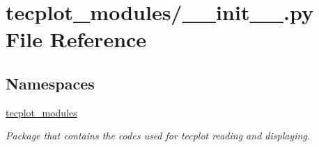 \hypertarget{a00323}{}\section{tecplot\+\_\+modules/\+\_\+\+\_\+init\+\_\+\+\_\+.py File Reference}
\label{a00323}
\subsection*{Namespaces}
\begin{DoxyCompactItemize}
\item 
 \hyperlink{a00062}{tecplot\+\_\+modules}
\begin{DoxyCompactList}\small\item\em Package that contains the codes used for tecplot reading and displaying. \end{DoxyCompactList}\end{DoxyCompactItemize}

